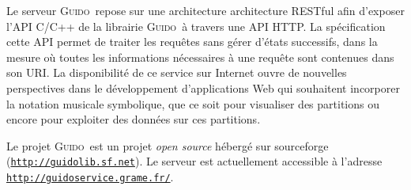 \documentclass{article}
\newcommand{\icode}[1]		{{\small \texttt{#1}}}
\newcommand{\guido}		{\textsc{Guido}}
\begin{document}
Le serveur \guido\ repose sur une architecture architecture RESTful afin d'exposer l'API C/C++ de la librairie \guido\ à travers une  API HTTP. La spécification cette API permet de traiter les requêtes sans gérer d'états successifs, dans la mesure où toutes les informations nécessaires à une requête sont contenues dans son URI. 
La disponibilité de ce service sur Internet ouvre de nouvelles perspectives dans le développement d'applications Web qui souhaitent incorporer la notation musicale symbolique, que ce soit pour visualiser des partitions ou encore pour exploiter des données sur ces partitions. 

Le projet \guido\ est un projet \emph{open source} hébergé sur sourceforge (\icode{\url{http://guidolib.sf.net}}). Le serveur est actuellement accessible à l'adresse \\
\icode{\url{http://guidoservice.grame.fr/}}.

\balance


\end{document}
